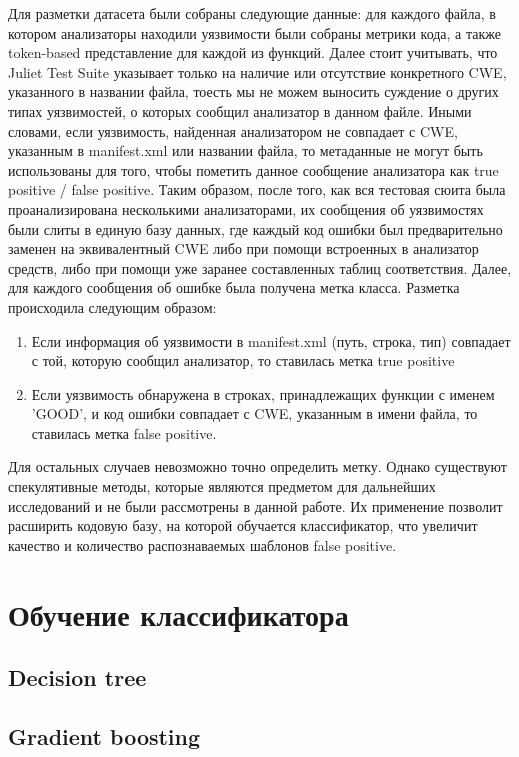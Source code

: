 Для разметки датасета были собраны следующие данные: для каждого файла, в котором анализаторы находили уязвимости были собраны метрики кода, а также token-based представление для каждой из функций. Далее стоит учитывать, что Juliet Test Suite указывает только на наличие или отсутствие конкретного CWE, указанного в названии файла, тоесть мы не можем выносить суждение о других типах уязвимостей, о которых сообщил анализатор в данном файле. Иными словами, если уязвимость, найденная анализатором не совпадает с CWE, указанным в manifest.xml или названии файла, то метаданные не могут быть использованы для того, чтобы пометить данное сообщение анализатора как true positive / false positive. Таким образом, после того, как вся тестовая сюита была проанализирована несколькими анализаторами, их сообщения об уязвимостях были слиты в единую базу данных, где каждый код ошибки был предварительно заменен на эквивалентный CWE либо при помощи встроенных в анализатор средств, либо при помощи уже заранее составленных таблиц соответствия. Далее, для каждого сообщения об ошибке была получена метка класса. Разметка происходила следующим образом:

\begin{enumerate}
    \item Если информация об уязвимости в manifest.xml (путь, строка, тип) совпадает с той, которую сообщил анализатор, то ставилась метка true positive
    \item Если уязвимость обнаружена в строках, принадлежащих функции с именем 'GOOD', и код ошибки совпадает с CWE, указанным в имени файла, то ставилась метка false positive.
\end{enumerate}

Для остальных случаев невозможно точно определить метку. Однако существуют спекулятивные методы, которые являются предметом для дальнейших исследований и не были рассмотрены в данной работе. Их применение позволит расширить кодовую базу, на которой обучается классификатор, что увеличит качество и количество распознаваемых шаблонов false positive.

\section{Обучение классификатора}



\subsection{Decision tree}
\subsection{Gradient boosting}


\newpage